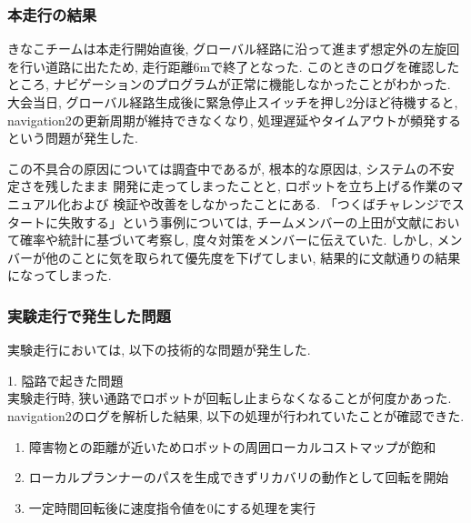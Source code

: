 \subsubsection{本走行の結果}
きなこチームは本走行開始直後, グローバル経路に沿って進まず想定外の左旋回を行い道路に出たため, 走行距離6mで終了となった. 
このときのログを確認したところ, 
ナビゲーションのプログラムが正常に機能しなかったことがわかった. 
大会当日, グローバル経路生成後に緊急停止スイッチを押し2分ほど待機すると, navigation2の更新周期が維持できなくなり, 処理遅延やタイムアウトが頻発するという問題が発生した. 

この不具合の原因については調査中であるが, 
根本的な原因は, システムの不安定さを残したまま
開発に走ってしまったことと, 
ロボットを立ち上げる作業のマニュアル化および
検証や改善をしなかったことにある. 
「つくばチャレンジでスタートに失敗する」という事例については, 
チームメンバーの上田が文献\cite{上田確率}において確率や統計に基づいて考察し, 
度々対策をメンバーに伝えていた. しかし, 
メンバーが他のことに気を取られて優先度を下げてしまい, 
結果的に文献通りの結果になってしまった. 


\subsubsection{実験走行で発生した問題}
実験走行においては, 以下の技術的な問題が発生した. 

1. 隘路で起きた問題\\
実験走行時, 狭い通路でロボットが回転し止まらなくなることが何度かあった. 
navigation2のログを解析した結果, 以下の処理が行われていたことが確認できた. 

\begin{enumerate}
  \item 障害物との距離が近いためロボットの周囲ローカルコストマップが飽和
  \item ローカルプランナーのパスを生成できずリカバリの動作として回転を開始
  \item  一定時間回転後に速度指令値を0にする処理を実行
\end{enumerate}

